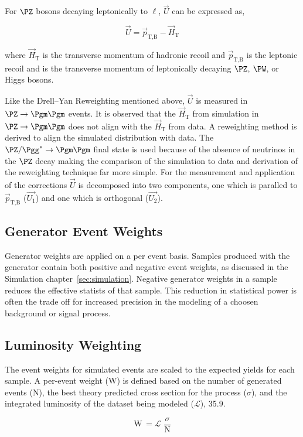 For $\PZ$ bosons decaying leptonically to $\ell$, $\vec{U}$ can be expressed as,

\begin{equation}
\vec{U} = \vec{p}_{\text{T,B}} - \vec{H}_{\text{T}}
\end{equation}

where $\vec{H}_{\text{T}}$ is the transverse momentum of hadronic recoil and $\vec{p}_{\text{T,B}}$
is the leptonic recoil and is the transverse momentum of leptonically decaying $\PZ$, $\PW$, or Higgs bosons.

Like the Drell--Yan Reweighting mentioned above, $\vec{U}$ is measured in $\PZ\to\Pgm\Pgm$ events.
It is observed that the $\vec{H}_{\text{T}}$ from simulation in $\PZ\to\Pgm\Pgm$ does not align with
the $\vec{H}_{\text{T}}$ from data. A reweighting method is derived to align the simulated distribution with 
data. The $\PZ/\Pgg^*\to\Pgm\Pgm$
final state is used because of the absence of neutrinos in the $\PZ$ decay making the comparison of
the simulation to data and derivation of the reweighting technique far more simple. For the measurement
and application of the corrections $\vec{U}$ is decomposed into two components, one which is
paralled to $\vec{p}_{\text{T,B}}$ ($\vec{U_{1}}$) and one which is orthogonal ($\vec{U_{2}}$).


\subsection{Generator Event Weights}
Generator weights are applied on a per event basis. Samples produced with the \aMCATNLO generator
contain both positive and negative event weights, as discussed in the Simulation chapter~\ref{sec:simulation}.
Negative generator weights in a sample reduces the effective statists of that sample. This reduction
in statistical power is often the trade off for increased precision in the modeling of a choosen
background or signal process.


\subsection{Luminosity Weighting}
The event weights for simulated events are scaled to the expected yields for each sample. A per-event
weight (W) is defined based on the number of generated events (N), the best theory predicted cross section
for the process ($\sigma$), and the integrated luminosity of the dataset being modeled 
($\mathcal{L}$), 35.9\fbinv.

\begin{equation}
\text{W} \, = \mathcal{L} \, \,  \frac{\sigma}{\text{N}}
\end{equation}

